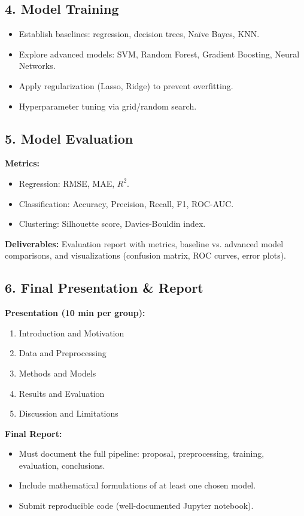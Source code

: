 \documentclass[a4paper,10pt]{article}
\begin{document}
\subsection*{4. Model Training}
\begin{itemize}
    \item Establish baselines: regression, decision trees, Naïve Bayes, KNN.
    \item Explore advanced models: SVM, Random Forest, Gradient Boosting, Neural Networks.
    \item Apply regularization (Lasso, Ridge) to prevent overfitting.
    \item Hyperparameter tuning via grid/random search.
\end{itemize}


\subsection*{5. Model Evaluation}
\textbf{Metrics:}
\begin{itemize}
    \item Regression: RMSE, MAE, $R^2$.
    \item Classification: Accuracy, Precision, Recall, F1, ROC-AUC.
    \item Clustering: Silhouette score, Davies-Bouldin index.
\end{itemize}
\textbf{Deliverables:} Evaluation report with metrics, baseline vs. advanced model comparisons, and visualizations (confusion matrix, ROC curves, error plots).

\subsection*{6. Final Presentation \& Report }
\textbf{Presentation (10 min per group):}
\begin{enumerate}
    \item Introduction and Motivation
    \item Data and Preprocessing
    \item Methods and Models
    \item Results and Evaluation
    \item Discussion and Limitations
\end{enumerate}

\textbf{Final Report:}
\begin{itemize}
    \item Must document the full pipeline: proposal, preprocessing, training, evaluation, conclusions.
    \item Include mathematical formulations of at least one chosen model.
    \item Submit reproducible code (well-documented Jupyter notebook).
\end{itemize}
\end{document}
